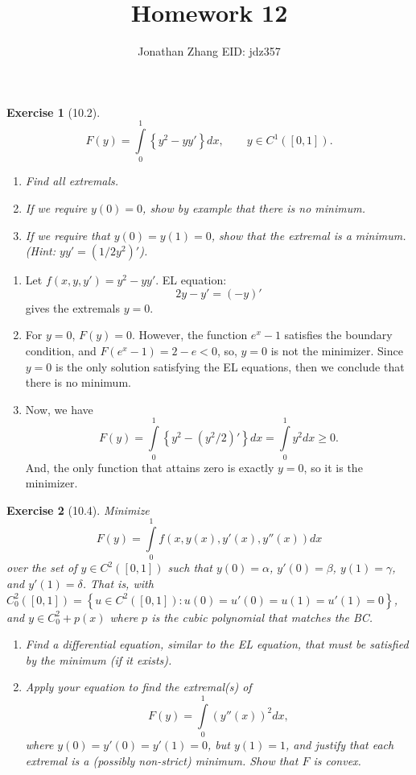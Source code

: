\documentclass[letterpaper,twoside,11pt]{article}
\theoremstyle{mystyle}
\newtheorem*{exercise}{Exercise}
\newcommand{\cbk}{\color{black}}
\newcommand{\cred}{\color{red}}
\newcommand{\cblu}{\color{blue}}
\begin{document}
\selectfont     %
\title{\vspace{-2\baselineskip} 
Homework 12
}
\author{Jonathan Zhang \qquad EID: { jdz357} }
\date{}
\maketitle


\begin{exercise}[10.2]
  \[F(y) = \int\limits_0^1 \left\{ y^2 - yy' \right\}dx, \qquad y \in C^1 \left( [0,1] \right).\]
  \begin{enumerate}
    \item Find all extremals. 
    \item If we require $y(0) = 0$, show by example that there is no minimum. 
    \item If we require that $y(0) = y(1) = 0$, show that the extremal is a minimum. (Hint: $yy' = \left( 1/2 y^2  \right)'$).
  \end{enumerate}
\end{exercise}

\cblu 

\begin{enumerate}
  \item Let \(f(x, y, y') = y^2 - yy'\). EL equation:
  \[2y-y'=\left( -y \right)'\]
  gives the extremals $y = 0$. 
  \item For $y = 0$, $F(y) = 0$. However, the function $e^x - 1$ satisfies the boundary condition, and $F(e^x - 1)=2-e < 0$, so, $y = 0$ is not the minimizer. Since $y = 0$ is the only solution satisfying the EL equations, then we conclude that there is no minimum.  
  \item Now, we have 
  \[F(y) = \int\limits_0^1 \left\{ y^2 - (y^2/2)' \right\}dx = \int\limits_0^1 y^2 dx \geq 0. \]
  And, the only function that attains zero is exactly $y = 0$, so it is the minimizer. 
\end{enumerate}

\cbk 

\begin{exercise}[10.4]
  Minimize 
  \[F(y) = \int\limits_0^1 f(x, y(x), y'(x), y''(x)) dx\]
  over the set of $y \in C^2([0,1])$ such that $y(0) = \alpha$, $y'(0) = \beta$, $y(1) = \gamma$, and $y'(1) = \delta$. That is, with $C_0^2([0,1]) = \left\{ u \in C^2 ([0,1]) : u(0) = u'(0) = u(1) = u'(1) = 0 \right\}$, and $y \in C_0^2 + p(x)$ where $p$ is the cubic polynomial that matches the BC. 
  \begin{enumerate}
    \item Find a differential equation, similar to the EL equation, that must be satisfied by the minimum (if it exists). 
    \item Apply your equation to find the extremal(s) of 
    \[F(y) = \int\limits_0^1 \left( y''(x) \right)^2 dx,\]
    where $y(0) = y'(0) = y'(1) = 0$, but $y(1) = 1$, and justify that each extremal is a (possibly non-strict) minimum. \cred Show that $F$ is convex. 
  \end{enumerate}
\end{exercise}
\end{document}
